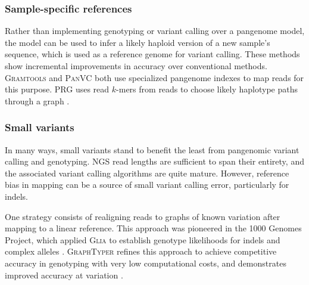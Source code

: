 
\subsubsection{Sample-specific references}

Rather than implementing genotyping or variant calling over a pangenome model, the model can be used to infer a likely haploid version of a new sample's sequence, which is used as a reference genome for variant calling.
These methods show incremental improvements in accuracy over conventional methods.
\textsc{Gramtools} \cite{Maciuca_2016} and \textsc{PanVC} \cite{Valenzuela_2018} both use specialized pangenome indexes to map reads for this purpose.
\textsc{PRG} uses read $k$-mers from reads to choose likely haplotype paths through a graph \cite{dilthey2015improved}.

\subsubsection{Small variants}

In many ways, small variants stand to benefit the least from pangenomic variant calling and genotyping.
NGS read lengths are sufficient to span their entirety, and the associated variant calling algorithms are quite mature.
However, reference bias in mapping can be a source of small variant calling error, particularly for indels. %

One strategy consists of realigning reads to graphs of known variation after mapping to a linear reference.
This approach was pioneered in the 1000 Genomes Project, which applied \textsc{Glia} to establish genotype likelihoods for indels and complex alleles \cite{1000_2015}.
\textsc{GraphTyper} refines this approach to achieve competitive accuracy in genotyping with very low computational costs, and demonstrates improved accuracy at variation \cite{eggertsson2017graphtyper}.


